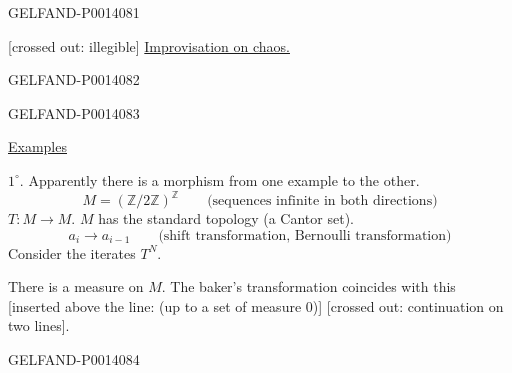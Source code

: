 \begin{GelfandAdjacentEvidence}{GELFAND-P001408}{1}

[crossed out: illegible]
\uline{Improvisation on chaos.}

\end{GelfandAdjacentEvidence}
\begin{GelfandAdjacentEvidence}{GELFAND-P001408}{2}



\end{GelfandAdjacentEvidence}
\begin{GelfandAdjacentEvidence}{GELFAND-P001408}{3}


\uline{Examples}

\(1^\circ\). Apparently there is a morphism from one example to the other.
\[
M=(\mathbb{Z}/2\mathbb{Z})^{\mathbb{Z}}
\qquad\text{(sequences infinite in both directions)}
\]
\(T:M\to M\). \(M\) has the standard topology (a Cantor set).
\[
a_i\to a_{i-1}\qquad\text{(shift transformation, Bernoulli transformation)}
\]
Consider the iterates \(T^N\).

There is a measure on \(M\). The baker’s transformation coincides with this
[inserted above the line: (up to a set of measure \(0\))]
[crossed out: continuation on two lines].
\end{GelfandAdjacentEvidence}
\begin{GelfandAdjacentEvidence}{GELFAND-P001408}{4}


\end{GelfandAdjacentEvidence}
